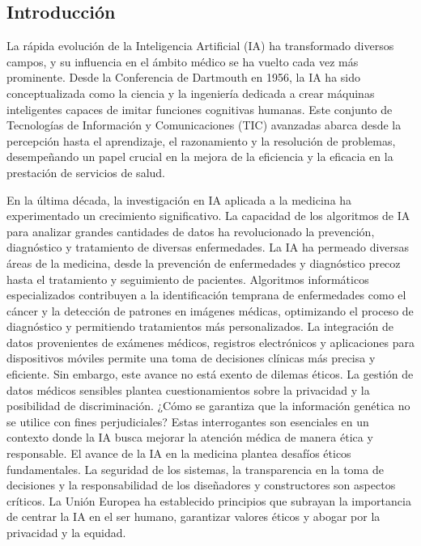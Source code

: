 \documentclass[10pt]{article}
\begin{document}
\begin{center}
    \section{Introducción}
\end{center}

La rápida evolución de la Inteligencia Artificial (IA) ha transformado diversos campos, y su influencia en el ámbito médico se ha vuelto cada vez más prominente.
Desde la Conferencia de Dartmouth en 1956, la IA ha sido conceptualizada como la ciencia y la ingeniería dedicada a crear máquinas inteligentes capaces de imitar funciones cognitivas humanas. Este conjunto de Tecnologías de Información y Comunicaciones (TIC) avanzadas abarca desde la percepción hasta el aprendizaje, el razonamiento y la resolución de problemas, desempeñando un papel crucial en la mejora de la eficiencia y la eficacia en la prestación de servicios de salud.

En la última década, la investigación en IA aplicada a la medicina ha experimentado un crecimiento significativo. La capacidad de los algoritmos de IA para analizar grandes cantidades de datos ha revolucionado la prevención, diagnóstico y tratamiento de diversas enfermedades. La IA ha permeado diversas áreas de la medicina, desde la prevención de enfermedades y diagnóstico precoz hasta el tratamiento y seguimiento de pacientes. Algoritmos informáticos especializados contribuyen a la identificación temprana de enfermedades como el cáncer y la detección de patrones en imágenes médicas, optimizando el proceso de diagnóstico y permitiendo tratamientos más personalizados. La integración de datos provenientes de exámenes médicos, registros electrónicos y aplicaciones para dispositivos móviles permite una toma de decisiones clínicas más precisa y eficiente.
Sin embargo, este avance no está exento de dilemas éticos. La gestión de datos médicos sensibles plantea cuestionamientos sobre la privacidad y la posibilidad de discriminación. ¿Cómo se garantiza que la información genética no se utilice con fines perjudiciales? Estas interrogantes son esenciales en un contexto donde la IA busca mejorar la atención médica de manera ética y responsable.
El avance de la IA en la medicina plantea desafíos éticos fundamentales. La seguridad de los sistemas, la transparencia en la toma de decisiones y la responsabilidad de los diseñadores y constructores son aspectos críticos. La Unión Europea ha establecido principios que subrayan la importancia de centrar la IA en el ser humano, garantizar valores éticos y abogar por la privacidad y la equidad.
\end{document}
